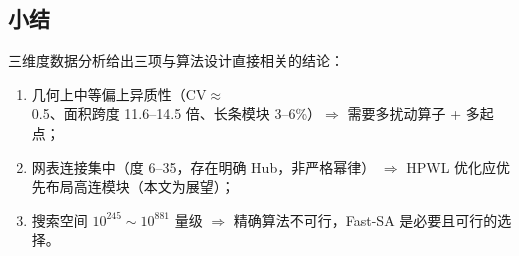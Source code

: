 \documentclass[12pt,a4paper]{article}
\begin{document}
\subsection{小结}

三维度数据分析给出三项与算法设计直接相关的结论：
\begin{enumerate}[leftmargin=2em]
    \item 几何上中等偏上异质性（CV$\approx$0.5、面积跨度 11.6--14.5
    倍、长条模块 3--6\%）$\Rightarrow$ 需要多扰动算子 + 多起点；
    \item 网表连接集中（度 6--35，存在明确 Hub，非严格幂律）
    $\Rightarrow$ HPWL 优化应优先布局高连模块（本文为展望）；
    \item 搜索空间 $10^{245}\sim10^{881}$ 量级
    $\Rightarrow$ 精确算法不可行，Fast-SA 是必要且可行的选择。
\end{enumerate}
\end{document}
